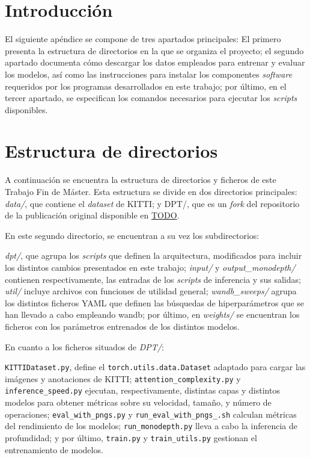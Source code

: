 \label{documentacion}

\section{Introducción}
El siguiente apéndice se compone de tres apartados principales: El primero presenta la estructura de directorios en la que se organiza el proyecto; el segundo apartado documenta cómo descargar los datos empleados para entrenar y evaluar los modelos, así como las instrucciones para instalar los componentes \textit{software} requeridos por los programas desarrollados en este trabajo; por último, en el tercer apartado, se especifican los comandos necesarios para ejecutar los \textit{scripts} disponibles.

\section{Estructura de directorios}

A continuación se encuentra la estructura de directorios y ficheros de este Trabajo Fin de Máster. Esta estructura se divide en dos directorios principales: \textit{data/}, que contiene el \textit{dataset} de KITTI; y DPT/, que es un \textit{fork} del repositorio de la publicación original \cite{visiontransformersDPT} disponible en \url{TODO}.

En este segundo directorio, se encuentran a su vez los subdirectorios: 

\textit{dpt/}, que agrupa los \textit{scripts} que definen la arquitectura, modificados para incluir los distintos cambios presentados en este trabajo; \textit{input/} y \textit{output{\_}monodepth/} contienen respectivamente, las entradas de los \textit{scripts} de inferencia y sus salidas; \textit{util/} incluye archivos con funciones de utilidad general; \textit{wandb{\_}sweeps/} agrupa los distintos ficheros YAML que definen las búsquedas de hiperparámetros que se han llevado a cabo empleando wandb; por último, en \textit{weights/} se encuentran los ficheros con los parámetros entrenados de los distintos modelos.

En cuanto a los ficheros situados de \textit{DPT/}: 

\texttt{KITTIDataset.py}, define el \texttt{torch.utils.data.Dataset} adaptado para cargar las imágenes y anotaciones de KITTI; \texttt{attention{\_}complexity.py} y \texttt{inference{\_}speed.py} ejecutan, respectivamente, distintas capas y distintos modelos para obtener métricas sobre su velocidad, tamaño, y número de operaciones; \texttt{eval{\_}with{\_}pngs.py} y \texttt{run{\_}eval{\_}with{\_}pngs{\_}.sh} calculan métricas del rendimiento de los modelos; \texttt{run{\_}monodepth.py} lleva a cabo la inferencia de profundidad; y por último, \texttt{train.py} y \texttt{train{\_}utils.py} gestionan el entrenamiento de modelos.

